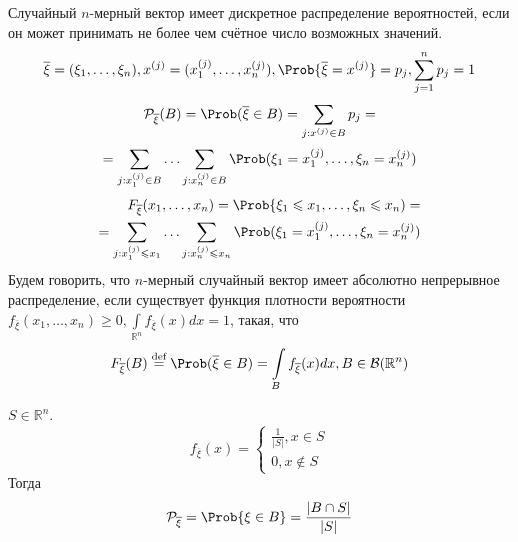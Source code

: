 Случайный $n$-мерный вектор имеет дискретное распределение вероятностей, если он может принимать не более чем счётное число возможных значений.
\[
	\overline{\xi} = (\xi_1, \ldots, \xi_n), x^{(j)} = (x_1^{(j)}, \ldots, x_n^{(j)}), \Prob \{ \overline{\xi} = x^{(j)} \} = p_j, \sum\limits_{j=1}^n p_j = 1
\]
\[
		\mathcal{P}_{\overline{\xi}} (B) = \Prob (\overline{\xi} \in B) = \sum\limits_{j: x^{(j)} \in B} p_j =
\]
\[
	= \sum\limits_{j: x_1^{(j)} \in B} \ldots \sum\limits_{j: x_n^{(j)} \in B} \Prob (\xi_1 = x_1^{(j)}, \ldots, \xi_n = x_n^{(j)})
\]
\[
	\begin{split}
		F_{\overline{\xi}} (x_1, \ldots, x_n) = \Prob \{ \xi_1  \leqslant x_1, \ldots, \xi_n \leqslant x_n) = \\
		 = \sum\limits_{j: x_1^{(j)} \leqslant x_1} \ldots \sum\limits_{j: x_n^{(j)} \leqslant x_n} \Prob (\xi_1 = x_1^{(j)}, \ldots, \xi_n = x_n^{(j)})
	\end{split}
\]
Будем говорить, что $n$-мерный случайный вектор имеет абсолютно непрерывное распределение, если существует функция плотности вероятности $f_{\overline{\xi}} (x_1, \ldots, x_n) \geqslant 0, \int\limits_{\mathbb{R}^n} f_{\overline{\xi}} (x) dx = 1$, такая, что
\[
	F_{\overline{\xi}} (B) \overset{\textrm{def}}{=} \Prob (\overline{\xi} \in B) = \int\limits_B f_{\overline{\xi}} (x) dx, B \in \mathcal{B} (\mathbb{R}^n)
\]
\begin{example}
	$S \in \mathbb{R}^n$. \\
	\[
		f_{\overline{\xi}} (x) = \begin{cases}
 		\frac{1}{|S|}, x \in S \\
 		0, x \not \in S
 		\end{cases}
	\]
	Тогда
	\[
		\mathcal{P}_{\overline{\xi}} = \Prob \{ \xi \in B \} = \frac{|B \cap S|}{|S|}
	\]
\end{example}
